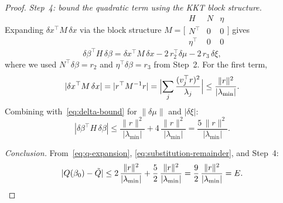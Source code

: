 \begin{proof}
\emph{Step~4: bound the quadratic term
  using the KKT block structure.}
Expanding $\delta x^\top M\,\delta x$
via the block structure
$M = \bigl[\begin{smallmatrix}
  H & N & \eta \\
  N^\top & 0 & 0 \\
  \eta^\top & 0 & 0
\end{smallmatrix}\bigr]$
gives
\begin{equation}\label{eq:block-identity}
  \delta\beta^\top H\,\delta\beta
  = \delta x^\top M\,\delta x
    - 2\,r_2^\top\delta\mu
    - 2\,r_3\,\delta\xi,
\end{equation}
where we used $N^\top\delta\beta = r_2$
and $\eta^\top\delta\beta = r_3$ from Step~2.
For the first term,
\[
  |\delta x^\top M\,\delta x|
  = |r^\top M^{-1} r|
  = \Bigl|\sum_j \frac{(v_j^\top r)^2}{\lambda_j}\Bigr|
  \leq \frac{\|r\|^2}{|\lambda_{\min}|}.
\]
Combining with~\eqref{eq:delta-bound}
for $\|\delta\mu\|$ and $|\delta\xi|$:
\[
  |\delta\beta^\top H\,\delta\beta|
  \leq \frac{\|r\|^2}{|\lambda_{\min}|}
    + 4\,\frac{\|r\|^2}{|\lambda_{\min}|}
  = \frac{5\,\|r\|^2}{|\lambda_{\min}|}.
\]


\emph{Conclusion.}
From~\eqref{eq:q-expansion},
\eqref{eq:substitution-remainder},
and Step~4:
\[
  |Q(\beta_0) - \tilde Q|
  \leq 2\,\frac{\|r\|^2}{|\lambda_{\min}|}
    + \frac{5}{2}\,\frac{\|r\|^2}{|\lambda_{\min}|}
  = \frac{9}{2}\,\frac{\|r\|^2}{|\lambda_{\min}|}
  = E.
  \qedhere
\]
\end{proof}

